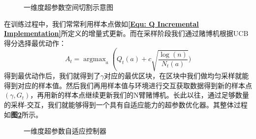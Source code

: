 \begin{figure}[!t]
	\centering
	\caption{一维度超参数空间切割示意图}
	\label{Fig: gamma tile coding}
\end{figure}

在训练过程中，我们常常利用样本点做如\textbf{\eqref{Equ: Q Incremental Implementation}}所定义的增量式更新。而在采样阶段我们通过赌博机根据UCB得分选择最优动作：
\begin{equation}
    A_{t}=\operatorname{argmax}_{a}\left( Q_{t}(a)+c \sqrt{\frac{\log (n)}{N_{t}(a)}} )\right.
\end{equation}
得到最优动作后，我们就得到了$\gamma$对应的最优区块，在区块中我们做均匀采样就能得到对应的样本值。然后我们再用样本值与环境进行交互获取数据得到新的样本点$(\gamma,G_t)$，再用新的样本点继续更新我们的N臂赌博机。长此以往，通过足够数量的采样-交互，我们就能够得到一个具有自适应能力的超参数优化器。其整体过程如\textbf{图\ref{Fig: gamma bandit}}所示。

\begin{figure}[!t]
	\centering
	\caption{一维度超参数自适应控制器}
	\label{Fig: gamma bandit}
\end{figure}

